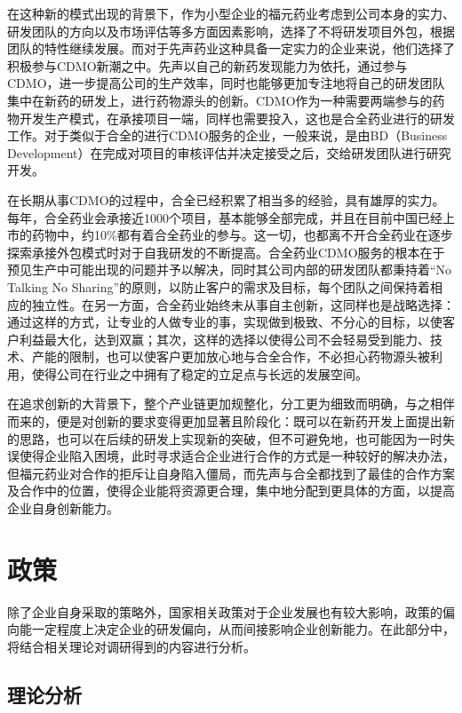 \documentclass[twocolumn,openany]{ctexbook}
\begin{document}
			在这种新的模式出现的背景下，作为小型企业的福元药业考虑到公司本身的实力、研发团队的方向以及市场评估等多方面因素影响，选择了不将研发项目外包，根据团队的特性继续发展。而对于先声药业这种具备一定实力的企业来说，他们选择了积极参与CDMO新潮之中。先声以自己的新药发现能力为依托，通过参与CDMO，进一步提高公司的生产效率，同时也能够更加专注地将自己的研发团队集中在新药的研发上，进行药物源头的创新。CDMO作为一种需要两端参与的药物开发生产模式，在承接项目一端，同样也需要投入，这也是合全药业进行的研发工作。对于类似于合全的进行CDMO服务的企业，一般来说，是由BD（Business Development）在完成对项目的审核评估并决定接受之后，交给研发团队进行研究开发。
			
			在长期从事CDMO的过程中，合全已经积累了相当多的经验，具有雄厚的实力。每年，合全药业会承接近1000个项目，基本能够全部完成，并且在目前中国已经上市的药物中，约10\%都有着合全药业的参与。这一切，也都离不开合全药业在逐步探索承接外包模式时对于自我研发的不断提高。合全药业CDMO服务的根本在于预见生产中可能出现的问题并予以解决，同时其公司内部的研发团队都秉持着“No Talking No Sharing”的原则，以防止客户的需求及目标，每个团队之间保持着相应的独立性。在另一方面，合全药业始终未从事自主创新，这同样也是战略选择：通过这样的方式，让专业的人做专业的事，实现做到极致、不分心的目标，以使客户利益最大化，达到双赢；其次，这样的选择以使得公司不会轻易受到能力、技术、产能的限制，也可以使客户更加放心地与合全合作，不必担心药物源头被利用，使得公司在行业之中拥有了稳定的立足点与长远的发展空间\citep{RN3}。
			
			
			\begin{framed}
				在追求创新的大背景下，整个产业链更加规整化，分工更为细致而明确，与之相伴而来的，便是对创新的要求变得更加显著且阶段化：既可以在新药开发上面提出新的思路，也可以在后续的研发上实现新的突破，但不可避免地，也可能因为一时失误使得企业陷入困境，此时寻求适合企业进行合作的方式是一种较好的解决办法，但福元药业对合作的拒斥让自身陷入僵局，而先声与合全都找到了最佳的合作方案及合作中的位置，使得企业能将资源更合理，集中地分配到更具体的方面，以提高企业自身创新能力。
			\end{framed}
			
			\section{政策}
			除了企业自身采取的策略外，国家相关政策对于企业发展也有较大影响，政策的偏向能一定程度上决定企业的研发偏向，从而间接影响企业创新能力。在此部分中，将结合相关理论对调研得到的内容进行分析。
			\subsection{理论分析}
\end{document}

